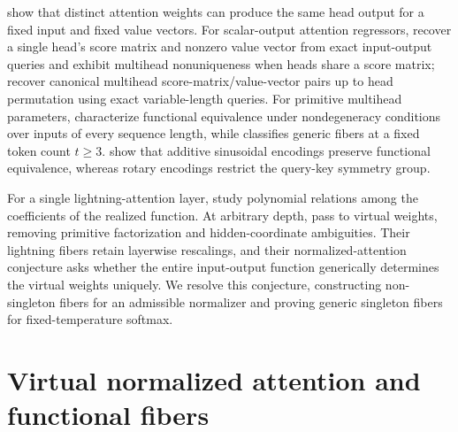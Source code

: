 \documentclass[mlmain]{jmlr}
\begin{document}
\citet{brunner2020} show that distinct attention weights can produce the same
head output for a fixed input and fixed value vectors.  For scalar-output
attention regressors, \citet{bhattamishra2026} recover a single head's score
matrix and nonzero value vector from exact input-output queries
and exhibit multihead nonuniqueness when heads share a score matrix;
\citet{kim2026queries} recover canonical multihead score-matrix/value-vector
pairs up to head permutation using exact variable-length queries.  For
primitive multihead parameters,
\citet{tran2025nfn} characterize functional equivalence under nondegeneracy
conditions over inputs of every sequence length, while
\citet{henry2026multihead} classifies generic fibers at a fixed token count
$t\ge3$.  \citet{tran2026attention} show that additive sinusoidal encodings
preserve functional equivalence, whereas rotary encodings restrict the
query-key symmetry group.

For a single lightning-attention layer, \citet{alexandr2026} study polynomial
relations among the coefficients of the realized function.  At arbitrary
depth, \citet*{henry2025} pass to virtual weights, removing primitive
factorization and hidden-coordinate ambiguities.  Their lightning fibers
retain layerwise rescalings, and their normalized-attention conjecture asks
whether the entire input-output function generically determines the virtual
weights uniquely.  We resolve this conjecture, constructing non-singleton
fibers for an admissible normalizer and proving generic singleton fibers for
fixed-temperature softmax.

\section{Virtual normalized attention and functional fibers}
\label{sec:model}
\end{document}
